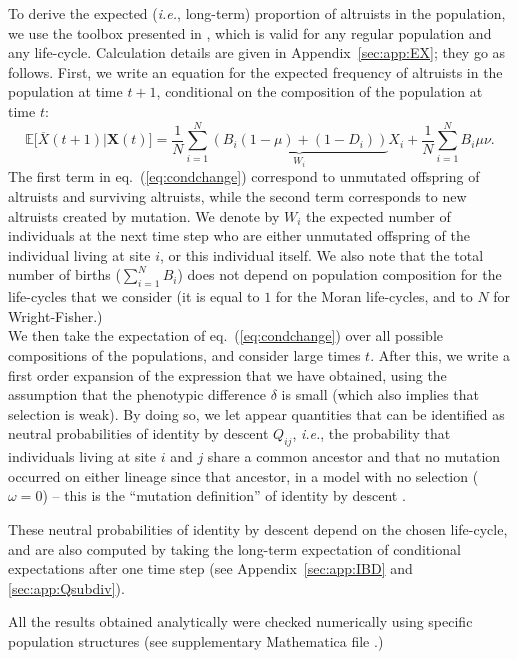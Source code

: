 \documentclass[11pt, letterpaper]{article}
\renewcommand{\eqref}[1]{\textup{{\normalfont eq.~(\ref{#1}}\normalfont)}}
\newcommand{\ie}{\textit{i.e.}}
\newcommand{\Esp}[1]{\mathbb{E}\big[ #1\big]}%
\newcommand{\appname}[0]{Appendix}
\begin{document}
To derive the expected (\ie, long-term) proportion of altruists in the population, we use the toolbox presented in \citet{Debarre2017}, which is valid for any regular population and any life-cycle. Calculation details are given in \appname~\ref{sec:app:EX}; they go as follows. First, we write an equation for the expected frequency of altruists in the population at time $t+1$, conditional on the composition of the population at time $t$:
\begin{equation}\label{eq:condchange}
\Esp{\overline{X}(t+1) | \mathbf{X}(t)} = %
\frac{1}{N} \sum_{i=1}^N \underbrace{\left( B_{i} (1-\mu) + (1-D_i) \right)}_{W_i} X_i + \frac{1}{N} \sum_{i=1}^N B_i \mu \nu. 
\end{equation}
The first term in \eqref{eq:condchange} correspond to unmutated offspring of altruists and surviving altruists, while the second term corresponds to new altruists created by mutation. We denote by $W_i$ the expected number of individuals at the next time step who are either unmutated offspring of the individual living at site $i$, or this individual itself. We also note that the total number of births ($\sum_{i=1}^N B_i$) does not depend on population composition for the life-cycles that we consider (it is equal to $1$ for the Moran life-cycles, and to $N$ for Wright-Fisher.)\\
We then take the expectation of \eqref{eq:condchange} over all possible compositions of the populations, and consider large times $t$. After this, we write a first order expansion of the expression that we have obtained, using the assumption that the phenotypic difference $\delta$ is small (which also implies that selection is weak). By doing so, we let appear quantities that can be identified as neutral probabilities of identity by descent $Q_{ij}$, \ie, the probability that individuals living at site $i$  and $j$ share a common ancestor and that no mutation occurred on either lineage since that ancestor, in a model with no selection ($\omega=0$) -- this is the ``mutation definition'' of identity by descent \citep{RoussetBilliard2000}. 

These neutral probabilities of identity by descent depend on the chosen life-cycle, and are also computed by taking the long-term expectation of conditional expectations after one time step (see \appname~\ref{sec:app:IBD} and \ref{sec:app:Qsubdiv}). 

All the results obtained analytically were checked numerically using specific population structures (see supplementary Mathematica file \citep{Mathematica11}.)
\end{document}
